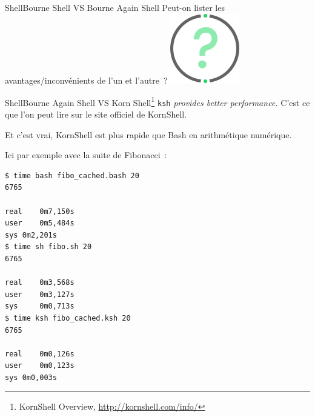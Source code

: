 \documentclass{beamer}
\begin{document}
    \begin{frame}{Shell}{Bourne Shell VS Bourne Again Shell}
        Peut-on lister les avantages/inconvénients de l'un et l'autre~?
        \bigbreak
        \centering
        \includegraphics[width=3cm]{image/question-mark}
    \end{frame}

    \begin{frame}[fragile]{Shell}{Bourne Again Shell VS Korn Shell\footnote{KornShell Overview, \url{http://kornshell.com/info/}}}
        \lstinline{ksh}\textit{ provides better performance.} C'est ce que l'on peut lire sur le site officiel de KornShell.

        Et c'est vrai, KornShell est plus rapide que Bash en arithmétique numérique.

        Ici par exemple avec la suite de Fibonacci~:
        \begin{lstlisting}[language=bash]
$ time bash fibo_cached.bash 20
6765

real	0m7,150s
user	0m5,484s
sys	0m2,201s
$ time sh fibo.sh 20
6765

real    0m3,568s
user    0m3,127s
sys     0m0,713s
$ time ksh fibo_cached.ksh 20
6765

real	0m0,126s
user	0m0,123s
sys	0m0,003s
        \end{lstlisting}
    \end{frame}
\end{document}
